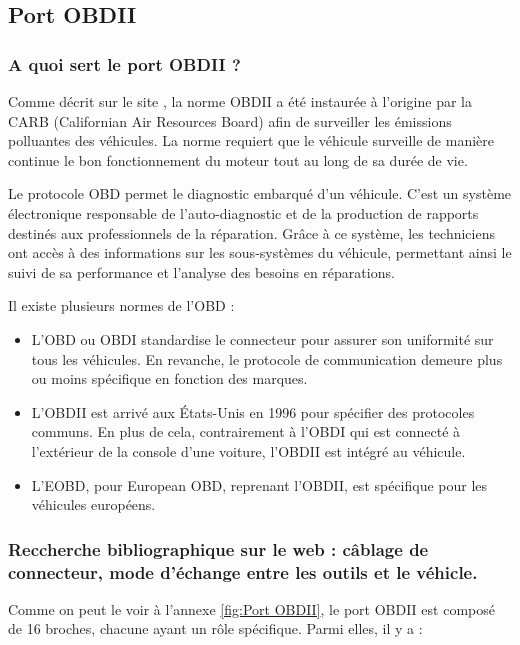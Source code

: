 \documentclass{rapportECC}
\begin{document}
\subsection{Port OBDII}

\subsubsection*{A quoi sert le port OBDII ?}

Comme décrit sur le site \cite{klavkarr}, la norme OBDII a été instaurée à l'origine par la CARB (Californian Air Resources Board) afin de surveiller les émissions polluantes des véhicules. La norme requiert que le véhicule surveille de manière continue le bon fonctionnement du moteur tout au long de sa durée de vie.

Le protocole OBD permet le diagnostic embarqué d'un véhicule. C'est un système électronique responsable de l'auto-diagnostic et de la production de rapports destinés aux professionnels de la réparation. Grâce à ce système, les techniciens ont accès à des informations sur les sous-systèmes du véhicule, permettant ainsi le suivi de sa performance et l'analyse des besoins en réparations.

Il existe plusieurs normes de l'OBD : 
\begin{itemize}
    \item L'OBD ou OBDI standardise le connecteur pour assurer son uniformité sur tous les véhicules. En revanche, le protocole de communication demeure plus ou moins spécifique en fonction des marques.
    \item L'OBDII est arrivé aux États-Unis en 1996 pour spécifier des protocoles communs. En plus de cela, contrairement à l'OBDI qui est connecté à l’extérieur de la console d'une voiture, l'OBDII est intégré au véhicule.
    \item L'EOBD, pour European OBD, reprenant l'OBDII, est spécifique pour les véhicules européens.
\end{itemize}

    
\subsubsection*{Reccherche bibliographique sur le web : câblage de connecteur, mode d'échange entre les outils et le véhicle.}

Comme on peut le voir à l'annexe \ref{fig:Port OBDII}, le port OBDII est composé de 16 broches, chacune ayant un rôle spécifique. Parmi elles, il y a :
\end{document}

